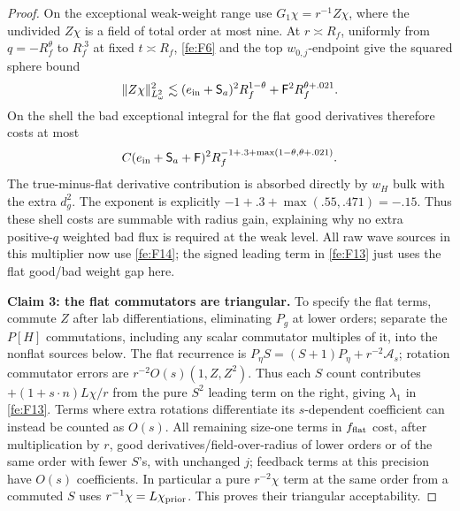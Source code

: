 \begin{proof}
On the exceptional weak-weight range use \(G_1\chi=r^{-1}Z\chi\), where the undivided \(Z\chi\) is a field of total order at most nine. At \(r\asymp R_f\), uniformly from \(q=-R_f^\theta\) to \(R_f^{.3}\) at fixed \(t\asymp R_f\), \eqref{fe:F6} and the top \(w_{0,j}\)-endpoint give the squared sphere bound
\begin{equation*}
\|Z\chi\|^2_{L^2_\omega}\lesssim
 (e_{\rm in}+\mathsf S_a)^2 R_f^{1-\theta}
       +\mathsf F^2 R_f^{\theta+.021}.
\end{equation*}
On the shell the bad exceptional integral for the flat good derivatives
therefore costs at most
\begin{equation*}
 C(e_{\rm in}+\mathsf S_a+\mathsf F)^2
 R_f^{-1+.3+\max(1-\theta,\theta+.021)}.
\end{equation*} The true-minus-flat derivative contribution is absorbed directly by \(w_H\) bulk with the extra \(d_g^2\). The exponent is explicitly
$-1+.3+\max(.55,.471)=-.15$.
Thus these shell costs are summable with radius gain, explaining why no
extra positive-$q$ weighted bad flux is required at the weak level. All raw wave sources in this multiplier now use \eqref{fe:F14}; the signed leading term in \eqref{fe:F13} just uses the flat good/bad weight gap here.

\par\medskip\noindent\textbf{Claim 3: the flat commutators are triangular.}\quad
To specify the flat terms, commute \(Z\) after lab differentiations, eliminating \(P_g\) at lower orders; separate the \(P[H]\) commutations, including any scalar commutator multiples of it, into the nonflat sources below. The flat recurrence is \(P_\eta S=(S+1)P_\eta+r^{-2}\mathcal A_s\); rotation commutator errors are \(r^{-2}O(s)(1,Z,Z^2)\). Thus each \(S\) count contributes \(+(1+s\cdot n)L\chi/r\) from the pure \(S^2\) leading term on the right, giving \(\lambda_1\) in \eqref{fe:F13}. Terms where extra rotations differentiate its \(s\)-dependent coefficient can instead be counted as \(O(s)\). All remaining size-one terms in \(f_{\rm flat}\) cost, after multiplication by \(r\), good derivatives/field-over-radius of lower orders or of the same order with fewer \(S\)'s, with unchanged \(j\); feedback terms at this precision have \(O(s)\) coefficients. In particular a pure \(r^{-2}\chi\) term at the same order from a commuted \(S\) uses \(r^{-1}\chi=L\chi_{\rm prior}\). This proves their triangular acceptability.


\end{proof}
